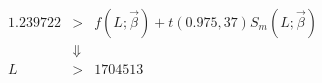 

\begin{eqnarray*}
1.239722 & > & f(L;\vec{\beta}) + t(0.975,37)S_m(L;\vec{\beta}) \\
         &   \Downarrow & \\
      L  & > & 1704513
\end{eqnarray*}


